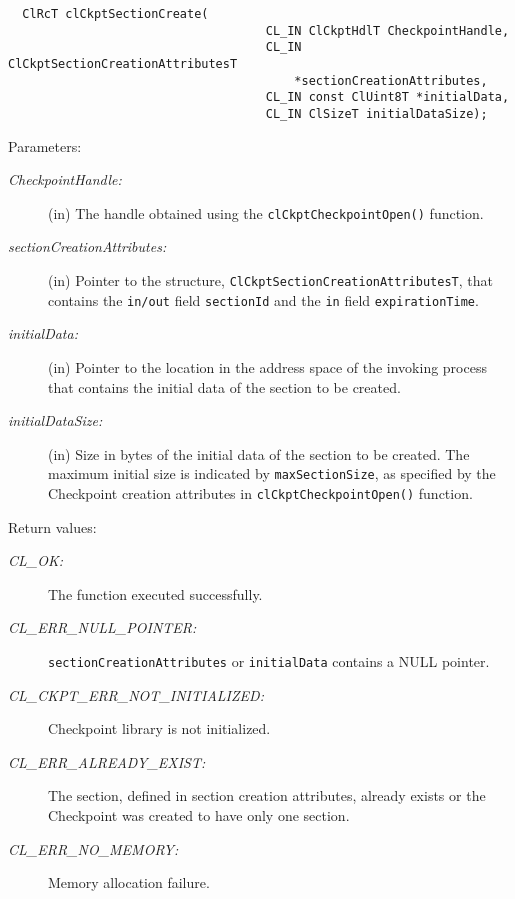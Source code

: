 \begin{flushleft}
\begin{Desc}
\footnotesize\begin{verbatim}  ClRcT clCkptSectionCreate(
                              		CL_IN ClCkptHdlT CheckpointHandle,
                              		CL_IN ClCkptSectionCreationAttributesT 
                              			*sectionCreationAttributes,
                              		CL_IN const ClUint8T *initialData,
                              		CL_IN ClSizeT initialDataSize);
\end{verbatim}
\normalsize
\end{Desc}
\begin{Desc}
\item[Parameters:]
\begin{description}
\item[{\em Checkpoint\-Handle:}](in) The handle obtained using the {\tt{clCkptCheckpointOpen()}} function.
\item[{\em section\-Creation\-Attributes:}](in) Pointer to the structure, {\tt{ClCkptSectionCreationAttributesT}}, that contains the {\tt{in/out}} field 
{\tt{section\-Id}} and the {\tt{in}} field {\tt{expiration\-Time}}.
\item[{\em initial\-Data:}](in) Pointer to the location in the address space of the invoking process that contains the initial data of the section to be 
created.\item[{\em initial\-Data\-Size:}](in) Size in bytes of the initial data of the section to be created. The maximum initial size is indicated by
{\tt{max\-Section\-Size}}, as specified by the Checkpoint creation attributes in {\tt{clCkptCheckpointOpen()}} function.
\end{description}
\end{Desc}
\begin{Desc}
\item[Return values:]
\begin{description}
\item[{\em CL\_\-OK:}]The function executed successfully. 
\item[{\em CL\_\-ERR\_\-NULL\_\-POINTER:}]{\tt{section\-Creation\-Attributes}} or {\tt{initialData}} contains a NULL pointer. 
\item[{\em CL\_\-CKPT\_\-ERR\_\-NOT\_\-INITIALIZED:}]Checkpoint library is not initialized. 
\item[{\em CL\_\-ERR\_\-ALREADY\_\-EXIST:}]The section, defined in section creation attributes, already exists or the Checkpoint was created to 
have only one section.
\item[{\em CL\_\-ERR\_\-NO\_\-MEMORY:}]Memory allocation failure.

\end{description}
\end{Desc}
\end{flushleft}
